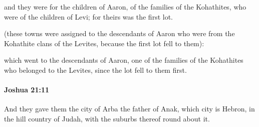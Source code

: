 			\begin{versebox}
					\item[BHS] 
					\item[ASV] and they were for the children of Aaron, of the families of the Kohathites, who were of the children of Levi; for theirs was the first lot.
					\item[NIV] (these towns were assigned to the descendants of Aaron who were from the Kohathite clans of the Levites, because the first lot fell to them):
					\item[NRSV] which went to the descendants of Aaron, one of the families of the Kohathites who belonged to the Levites, since the lot fell to them first.
			\end{versebox}

		\paragraph{Joshua 21:11} %
			\label{JOSHUA-21-11}

			And they gave them the city of Arba the father of Anak, which city is Hebron, in the hill country of Judah, with the suburbs thereof round about it.


